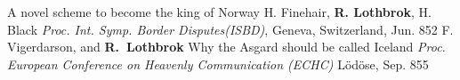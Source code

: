 \newcommand{\ThePackageCounters}{}

\addnotincludedpaper%
    {A novel scheme to become the king of Norway}%
    {H. Finehair, \textbf{R. Lothbrok}, H. Black}%
    {\textit{Proc. Int. Symp. Border Disputes(ISBD)}, Geneva, Switzerland, Jun. 852}
\addnotincludedpaper%
    {F. Vigerdarson, and \textbf{R.~Lothbrok}}%
    {Why the Asgard should be called Iceland}%
    {\textit{Proc. European Conference on Heavenly Communication (ECHC)} L\"{o}d\"{o}se, Sep. 855}


\newcommand{\needref}{\textcolor{red}{(source)}}	%


